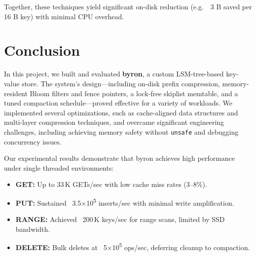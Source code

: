 \documentclass[10pt]{article}
\begin{document}
Together, these techniques yield significant on-disk reduction (e.g.\ ~3 B saved per 16 B key) with minimal CPU overhead.

\section*{Conclusion}
In this project, we built and evaluated \textbf{byron}, a custom LSM-tree-based key-value store. The system’s design—including on-disk prefix compression, memory-resident Bloom filters and fence pointers, a lock-free skiplist memtable, and a tuned compaction schedule—proved effective for a variety of workloads. We implemented several optimizations, such as cache-aligned data structures and multi-layer compression techniques, and overcame significant engineering challenges, including achieving memory safety without \texttt{unsafe} and debugging concurrency issues.

Our experimental results demonstrate that byron achieves high performance under single threaded environments:
\begin{itemize}[leftmargin=1em,itemsep=0.5ex]
  \item \textbf{GET:} Up to 33\,K GETs/sec with low cache miss rates (3–8\%).
  \item \textbf{PUT:} Sustained ~3.5×10\textsuperscript{5} inserts/sec with minimal write amplification.
  \item \textbf{RANGE:} Achieved ~200\,K keys/sec for range scans, limited by SSD bandwidth.
  \item \textbf{DELETE:} Bulk deletes at ~5×10\textsuperscript{5} ops/sec, deferring cleanup to compaction.
\end{itemize}
\end{document}
